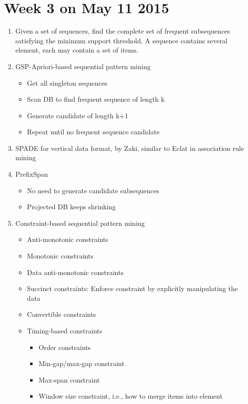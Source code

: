 \documentclass[12pt, a4paper]{article}
\begin{document}
\section{Week 3 on May 11 2015}
\begin{enumerate}
\item Given a set of sequences, find the complete set of frequent subsequences satisfying the minimum support threshold. A sequence contains several element, each may contain a set of items.

\item GSP-Apriori-based sequential pattern mining
   \begin{itemize}
      \item Get all singleton sequences
      \item Scan DB to find frequent sequence of length k
      \item Generate candidate of length k+1
      \item Repeat until no frequent sequence candidate
   \end{itemize}

\item SPADE for vertical data format, by Zaki, similar to Eclat in association rule mining

\item PrefixSpan
   \begin{itemize}
      \item No need to generate candidate subsequences
      \item Projected DB keeps shrinking
   \end{itemize}
 
 \item Constraint-based sequential pattern mining 
   \begin{itemize}
      \item Anti-monotonic constraints
      \item Monotonic constraints
      \item Data anti-monotonic constraints
      \item Succinct constraints: Enforce constraint by explicitly manipulating the data
      \item Convertible constraints
      \item Timing-based constraints
       \begin{itemize}
        \item Order constraints
        \item Min-gap/max-gap constraint
        \item Max-span constraint
        \item Window size constraint, i.e., how to merge items into element
       \end{itemize}
   \end{itemize}
   

\end{enumerate}
\end{document}
